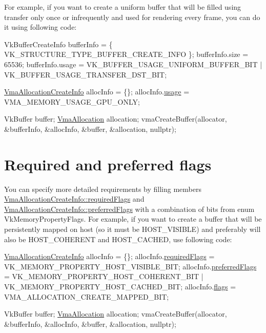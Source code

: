 For example, if you want to create a uniform buffer that will be filled using transfer only once or infrequently and used for rendering every frame, you can do it using following code\+:


\begin{DoxyCode}
VkBufferCreateInfo bufferInfo = \{ VK\_STRUCTURE\_TYPE\_BUFFER\_CREATE\_INFO \};
bufferInfo.size = 65536;
bufferInfo.usage = VK\_BUFFER\_USAGE\_UNIFORM\_BUFFER\_BIT | VK\_BUFFER\_USAGE\_TRANSFER\_DST\_BIT;

\hyperlink{structVmaAllocationCreateInfo}{VmaAllocationCreateInfo} allocInfo = \{\};
allocInfo.\hyperlink{structVmaAllocationCreateInfo_accb8b06b1f677d858cb9af20705fa910}{usage} = VMA\_MEMORY\_USAGE\_GPU\_ONLY;

VkBuffer buffer;
\hyperlink{structVmaAllocation}{VmaAllocation} allocation;
vmaCreateBuffer(allocator, &bufferInfo, &allocInfo, &buffer, &allocation, \textcolor{keyword}{nullptr});
\end{DoxyCode}
\hypertarget{choosing_memory_type_choosing_memory_type_required_preferred_flags}{}\section{Required and preferred flags}\label{choosing_memory_type_choosing_memory_type_required_preferred_flags}
You can specify more detailed requirements by filling members \hyperlink{structVmaAllocationCreateInfo_a9166390303ff42d783305bc31c2b6b90}{Vma\+Allocation\+Create\+Info\+::required\+Flags} and \hyperlink{structVmaAllocationCreateInfo_a7fe8d81a1ad10b2a2faacacee5b15d6d}{Vma\+Allocation\+Create\+Info\+::preferred\+Flags} with a combination of bits from enum {\ttfamily Vk\+Memory\+Property\+Flags}. For example, if you want to create a buffer that will be persistently mapped on host (so it must be {\ttfamily H\+O\+S\+T\+\_\+\+V\+I\+S\+I\+B\+LE}) and preferably will also be {\ttfamily H\+O\+S\+T\+\_\+\+C\+O\+H\+E\+R\+E\+NT} and {\ttfamily H\+O\+S\+T\+\_\+\+C\+A\+C\+H\+ED}, use following code\+:


\begin{DoxyCode}
\hyperlink{structVmaAllocationCreateInfo}{VmaAllocationCreateInfo} allocInfo = \{\};
allocInfo.\hyperlink{structVmaAllocationCreateInfo_a9166390303ff42d783305bc31c2b6b90}{requiredFlags} = VK\_MEMORY\_PROPERTY\_HOST\_VISIBLE\_BIT;
allocInfo.\hyperlink{structVmaAllocationCreateInfo_a7fe8d81a1ad10b2a2faacacee5b15d6d}{preferredFlags} = VK\_MEMORY\_PROPERTY\_HOST\_COHERENT\_BIT | 
      VK\_MEMORY\_PROPERTY\_HOST\_CACHED\_BIT;
allocInfo.\hyperlink{structVmaAllocationCreateInfo_add09658ac14fe290ace25470ddd6d41b}{flags} = VMA\_ALLOCATION\_CREATE\_MAPPED\_BIT;

VkBuffer buffer;
\hyperlink{structVmaAllocation}{VmaAllocation} allocation;
vmaCreateBuffer(allocator, &bufferInfo, &allocInfo, &buffer, &allocation, \textcolor{keyword}{nullptr});
\end{DoxyCode}


